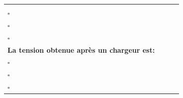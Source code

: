 \documentclass[11pt,a4paper]{article}
\newcommand{\oscibase}[1]{%
\begin{tikzpicture}[scale=0.18]
\draw[step=1 cm,gray!60,thin] (-5,-4) grid (5,4);
\draw[thick,-] (0,-4) -- (0,4);
\draw[thick,-] (-5,0) -- (5,0);
#1
\draw[black,very thick,rounded corners=5pt] (-5.1,-4.1) rectangle (5.1,4.1);
\end{tikzpicture}%
}
\newcommand{\oscidoublealternance}{%
\draw[black!70!black,thick,domain=-5:5,samples=50,smooth] 
    plot (\x,{abs(2.5*sin(\x*72))});%
}
\newcommand{\oscimonoalternance}{%
\draw[black!70!black,thick,domain=-5:5,samples=50,smooth] 
    plot (\x,{max(0, 2.5*sin(\x*72))});%
}
\newcommand{\oscicondensateur}{%
\draw[black!70!black,thick,domain=-5:5,samples=80,smooth] 
    plot (\x,{2.3 + 0.2*sin(\x*144)});%
}
\begin{document}
\begin{center}
\begin{tabularx}{\textwidth}{|>{\centering\arraybackslash}m{}|>{\centering\arraybackslash}m{}|>{\centering\arraybackslash}m{}|>{\centering\arraybackslash}m{}|}
{\begin{tabular}{c}
\oscibase{\oscidoublealternance}\\[0.3cm]
$\square$
\end{tabular}} & 
\adjustbox{valign=m}{\begin{tabular}{c}
\oscibase{\oscimonoalternance}\\[0.3cm]
$\square$
\end{tabular}} & 
\adjustbox{valign=m}{\begin{tabular}{c}
\oscibase{\oscicondensateur}\\[0.3cm]
$\square$
\end{tabular}} \\
\hline
\textbf{La tension obtenue après un chargeur est:} & 
\adjustbox{valign=m}{\begin{tabular}{c}
\oscibase{\oscidoublealternance}\\[0.3cm]
$\square$
\end{tabular}} & 
\adjustbox{valign=m}{\begin{tabular}{c}
\oscibase{\oscimonoalternance}\\[0.3cm]
$\square$
\end{tabular}} & 
\adjustbox{valign=m}{\begin{tabular}{c}
\oscibase{\oscicondensateur}\\[0.3cm]
$\square$
\end{tabular}} \\
\hline
\end{tabularx}
\end{center}
\end{document}
